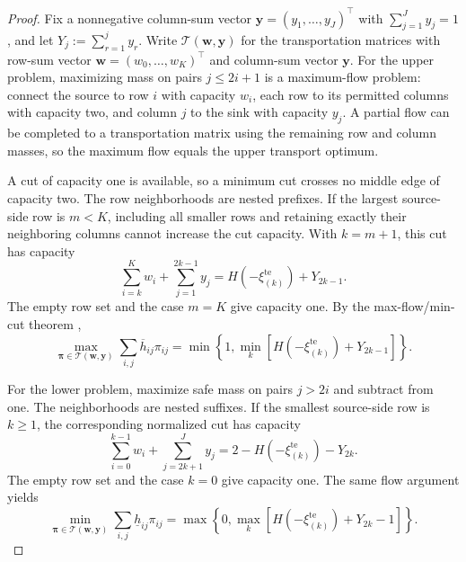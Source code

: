 \documentclass[review,11pt,3p,authoryear,nopreprintline]{elsarticle}
\begin{document}
\begin{proof}
  Fix a nonnegative column-sum vector $\bm y=(y_1,\ldots,y_J)^\top$ with $\sum_{j=1}^J y_j=1$, and let $Y_j:=\sum_{r=1}^j y_r$. Write $\mathcal T(\bm w,\bm y)$ for the transportation matrices with row-sum vector $\bm w=(w_0,\ldots,w_K)^\top$ and column-sum vector $\bm y$. For the upper problem, maximizing mass on pairs $j\le2i+1$ is a maximum-flow problem: connect the source to row $i$ with capacity $w_i$, each row to its permitted columns with capacity two, and column $j$ to the sink with capacity $y_j$. A partial flow can be completed to a transportation matrix using the remaining row and column masses, so the maximum flow equals the upper transport optimum.

  A cut of capacity one is available, so a minimum cut crosses no middle edge of capacity two. The row neighborhoods are nested prefixes. If the largest source-side row is $m<K$, including all smaller rows and retaining exactly their neighboring columns cannot increase the cut capacity. With $k=m+1$, this cut has capacity
  \[
    \sum_{i=k}^K w_i+\sum_{j=1}^{2k-1}y_j
    =H\left(-\xi_{(k)}^{\mathrm{te}}\right)+Y_{2k-1}.
  \]
  The empty row set and the case $m=K$ give capacity one. By the max-flow/min-cut theorem \citep{F.F56},
  \begin{equation*}
    \max_{\bm\pi\in\mathcal T(\bm w,\bm y)}
      \sum_{i,j}\overline h_{ij}\pi_{ij}
    =\min\left\{1,\min_k[H\left(-\xi_{(k)}^{\mathrm{te}}\right)+Y_{2k-1}]\right\}.
  \end{equation*}

  For the lower problem, maximize safe mass on pairs $j>2i$ and subtract from one. The neighborhoods are nested suffixes. If the smallest source-side row is $k\ge1$, the corresponding normalized cut has capacity
  \[
    \sum_{i=0}^{k-1}w_i+\sum_{j=2k+1}^Jy_j
    =2-H\left(-\xi_{(k)}^{\mathrm{te}}\right)-Y_{2k}.
  \]
  The empty row set and the case $k=0$ give capacity one. The same flow argument yields
  \begin{equation*}
    \min_{\bm\pi\in\mathcal T(\bm w,\bm y)}
      \sum_{i,j}\underline h_{ij}\pi_{ij}
    =\max\left\{0,\max_k[H\left(-\xi_{(k)}^{\mathrm{te}}\right)+Y_{2k}-1]\right\}.
  \end{equation*}


\end{proof}
\end{document}
